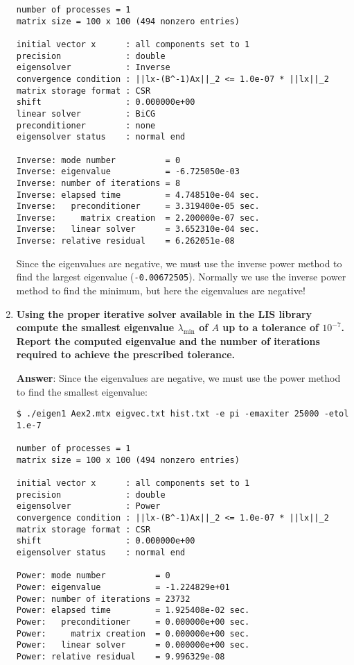 \begin{enumerate}[label=\textcolor{Green3}{\textbf{\arabic*.}}]
\begin{lstlisting}[mathescape=false]
number of processes = 1
matrix size = 100 x 100 (494 nonzero entries)

initial vector x      : all components set to 1
precision             : double
eigensolver           : Inverse
convergence condition : ||lx-(B^-1)Ax||_2 <= 1.0e-07 * ||lx||_2
matrix storage format : CSR
shift                 : 0.000000e+00
linear solver         : BiCG
preconditioner        : none
eigensolver status    : normal end

Inverse: mode number          = 0
Inverse: eigenvalue           = -6.725050e-03
Inverse: number of iterations = 8
Inverse: elapsed time         = 4.748510e-04 sec.
Inverse:   preconditioner     = 3.319400e-05 sec.
Inverse:     matrix creation  = 2.200000e-07 sec.
Inverse:   linear solver      = 3.652310e-04 sec.
Inverse: relative residual    = 6.262051e-08\end{lstlisting}
    Since the eigenvalues are negative, we must use the inverse power method to find the largest eigenvalue (\texttt{-0.00672505}). Normally we use the inverse power method to find the minimum, but here the eigenvalues are negative!


    \newpage

    \item \textcolor{Green3}{\textbf{%
        Using the proper iterative solver available in the LIS library compute the smallest eigenvalue $\lambda_{\min}$ of $A$ up to a tolerance of $10^{-7}$. Report the computed eigenvalue and the number of iterations required to achieve the prescribed tolerance.
    }}

    \textbf{Answer}: Since the eigenvalues are negative, we must use the power method to find the smallest eigenvalue:
    \begin{lstlisting}[mathescape=false]
$ ./eigen1 Aex2.mtx eigvec.txt hist.txt -e pi -emaxiter 25000 -etol 1.e-7

number of processes = 1
matrix size = 100 x 100 (494 nonzero entries)

initial vector x      : all components set to 1
precision             : double
eigensolver           : Power
convergence condition : ||lx-(B^-1)Ax||_2 <= 1.0e-07 * ||lx||_2
matrix storage format : CSR
shift                 : 0.000000e+00
eigensolver status    : normal end

Power: mode number          = 0
Power: eigenvalue           = -1.224829e+01
Power: number of iterations = 23732
Power: elapsed time         = 1.925408e-02 sec.
Power:   preconditioner     = 0.000000e+00 sec.
Power:     matrix creation  = 0.000000e+00 sec.
Power:   linear solver      = 0.000000e+00 sec.
Power: relative residual    = 9.996329e-08\end{lstlisting}



\end{enumerate}
